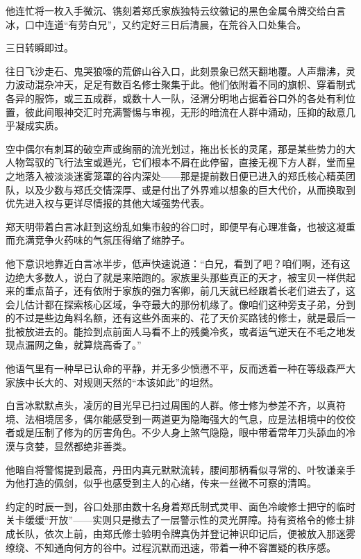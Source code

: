 他连忙将一枚入手微沉、镌刻着郑氏家族独特云纹徽记的黑色金属令牌交给白言冰，口中连道“有劳白兄”，又约定好三日后清晨，在荒谷入口处集合。

\vspace{2em}

三日转瞬即过。

\vspace{2em}

往日飞沙走石、鬼哭狼嚎的荒僻山谷入口，此刻景象已然天翻地覆。人声鼎沸，灵力波动混杂冲天，足足有数百名修士聚集于此。他们依附着不同的旗帜、穿着制式各异的服饰，或三五成群，或数十人一队，泾渭分明地占据着谷口外的各处有利位置，彼此间眼神交汇时充满警惕与审视，无形的暗流在人群中涌动，压抑的敌意几乎凝成实质。

空中偶尔有刺耳的破空声或绚丽的流光划过，拖出长长的灵尾，那是某些势力的大人物驾驭的飞行法宝或遁光，它们根本不屑在此停留，直接无视下方人群，堂而皇之地落入被淡淡迷雾笼罩的谷内深处——那是提前数日便已进入的郑氏核心精英团队，以及少数与郑氏交情深厚、或是付出了外界难以想象的巨大代价，从而换取到优先进入权与更详尽情报的其他大域强势代表。

郑天明带着白言冰赶到这纷乱如集市般的谷口时，即便早有心理准备，也被这凝重而充满竞争火药味的气氛压得缩了缩脖子。

他下意识地靠近白言冰半步，低声快速说道：“白兄，看到了吧？咱们啊，还有这边绝大多数人，说白了就是来陪跑的。家族里头那些真正的天才，被宝贝一样供起来的重点苗子，还有依附于家族的强力客卿，前几天就已经跟着长老们进去了，这会儿估计都在探索核心区域，争夺最大的那份机缘了。像咱们这种旁支子弟，分到的不过是些边角料名额，还有这些外面来的、花了天价买路钱的修士，就是最后一批被放进去的。能捡到点前面人马看不上的残羹冷炙，或者运气逆天在不毛之地发现点漏网之鱼，就算烧高香了。”

他语气里有一种早已认命的平静，并无多少愤懑不平，反而透着一种在等级森严大家族中长大的、对规则天然的“本该如此”的坦然。

白言冰默默点头，凌厉的目光早已扫过周围的人群。修士修为参差不齐，以真符境、法相境居多，偶尔能感受到一两道更为隐晦强大的气息，应是法相境中的佼佼者或是压制了修为的厉害角色。不少人身上煞气隐隐，眼中带着常年刀头舔血的冷漠与贪婪，显然都绝非善类。

他暗自将警惕提到最高，丹田内真元默默流转，腰间那柄看似寻常的、叶牧谦亲手为他打造的佩剑，似乎也感受到主人的心绪，传来一丝微不可察的清鸣。

\vspace{2em}

约定的时辰一到，谷口处那由数十名身着郑氏制式灵甲、面色冷峻修士把守的临时关卡缓缓“开放”——实则只是撤去了一层警示性的灵光屏障。持有资格令的修士排成长队，依次上前，由郑氏修士验明令牌真伪并登记神识印记后，便被放入那迷雾缭绕、不知通向何方的谷中。过程沉默而迅速，带着一种不容置疑的秩序感。

